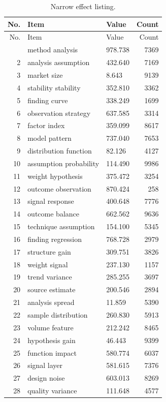 \documentclass[11pt]{report}
\begin{document}
\begin{longtable}{rllr}\caption{Narrow effect listing.}\label{tab:l11}\\\toprule No. & Item & Value & Count \\ \midrule \endfirsthead\toprule No. & Item & Value & Count \\ \midrule \endhead\bottomrule \endfoot
1 & method analysis & 978.738 & 7369 \\
2 & analysis assumption & 432.640 & 7169 \\
3 & market size & 8.643 & 9139 \\
4 & stability stability & 352.810 & 3362 \\
5 & finding curve & 338.249 & 1699 \\
6 & observation strategy & 637.585 & 3314 \\
7 & factor index & 359.099 & 8617 \\
8 & model pattern & 737.040 & 7653 \\
9 & distribution function & 82.126 & 4127 \\
10 & assumption probability & 114.490 & 9986 \\
11 & weight hypothesis & 375.472 & 3254 \\
12 & outcome observation & 870.424 & 258 \\
13 & signal response & 400.648 & 7776 \\
14 & outcome balance & 662.562 & 9636 \\
15 & technique assumption & 154.100 & 5345 \\
16 & finding regression & 768.728 & 2979 \\
17 & structure gain & 309.751 & 3826 \\
18 & weight signal & 237.130 & 1157 \\
19 & trend variance & 285.255 & 3697 \\
20 & source estimate & 200.546 & 2894 \\
21 & analysis spread & 11.859 & 5390 \\
22 & sample distribution & 260.830 & 5913 \\
23 & volume feature & 212.242 & 8465 \\
24 & hypothesis gain & 46.443 & 9399 \\
25 & function impact & 580.774 & 6037 \\
26 & signal layer & 581.615 & 7376 \\
27 & design noise & 603.013 & 8269 \\
28 & quality variance & 111.648 & 4577 \\

\end{longtable}
\end{document}
